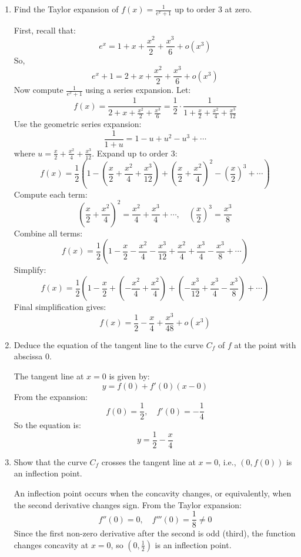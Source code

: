 \documentclass[12pt]{article}
\begin{document}
\begin{answerbox}
  \begin{enumerate}
    \item Find the Taylor expansion of $ f(x) = \frac{1}{e^x + 1} $ up to order 3 at zero.
    
    First, recall that:
    $$
    e^x = 1 + x + \frac{x^2}{2} + \frac{x^3}{6} + o(x^3)
    $$
    So,
    $$
    e^x + 1 = 2 + x + \frac{x^2}{2} + \frac{x^3}{6} + o(x^3)
    $$
    Now compute $ \frac{1}{e^x + 1} $ using a series expansion. Let:
    $$
    f(x) = \frac{1}{2 + x + \frac{x^2}{2} + \frac{x^3}{6}} = \frac{1}{2} \cdot \frac{1}{1 + \frac{x}{2} + \frac{x^2}{4} + \frac{x^3}{12}}
    $$
    Use the geometric series expansion:
    $$
    \frac{1}{1 + u} = 1 - u + u^2 - u^3 + \cdots
    $$
    where $ u = \frac{x}{2} + \frac{x^2}{4} + \frac{x^3}{12} $. Expand up to order 3:
    $$
    f(x) = \frac{1}{2} \left(1 - \left(\frac{x}{2} + \frac{x^2}{4} + \frac{x^3}{12}\right) + \left(\frac{x}{2} + \frac{x^2}{4}\right)^2 - \left(\frac{x}{2}\right)^3 + \cdots \right)
    $$
    Compute each term:
    $$
    \left(\frac{x}{2} + \frac{x^2}{4}\right)^2 = \frac{x^2}{4} + \frac{x^3}{4} + \cdots,\quad \left(\frac{x}{2}\right)^3 = \frac{x^3}{8}
    $$
    Combine all terms:
    $$
    f(x) = \frac{1}{2} \left(1 - \frac{x}{2} - \frac{x^2}{4} - \frac{x^3}{12} + \frac{x^2}{4} + \frac{x^3}{4} - \frac{x^3}{8} + \cdots \right)
    $$
    Simplify:
    $$
    f(x) = \frac{1}{2} \left(1 - \frac{x}{2} + \left(-\frac{x^2}{4} + \frac{x^2}{4}\right) + \left(-\frac{x^3}{12} + \frac{x^3}{4} - \frac{x^3}{8}\right) + \cdots \right)
    $$
    Final simplification gives:
    $$
    f(x) = \frac{1}{2} - \frac{x}{4} + \frac{x^3}{48} + o(x^3)
    $$

    \item Deduce the equation of the tangent line to the curve $ C_f $ of $ f $ at the point with abscissa 0.

    The tangent line at $ x = 0 $ is given by:
    $$
    y = f(0) + f'(0)(x - 0)
    $$
    From the expansion:
    $$
    f(0) = \frac{1}{2},\quad f'(0) = -\frac{1}{4}
    $$
    So the equation is:
    $$
    y = \frac{1}{2} - \frac{x}{4}
    $$

    \item Show that the curve $ C_f $ crosses the tangent line at $ x = 0 $, i.e., $ (0, f(0)) $ is an inflection point.

    An inflection point occurs when the concavity changes, or equivalently, when the second derivative changes sign. From the Taylor expansion:
    $$
    f''(0) = 0,\quad f'''(0) = \frac{1}{8} \neq 0
    $$
    Since the first non-zero derivative after the second is odd (third), the function changes concavity at $ x = 0 $, so $ (0, \frac{1}{2}) $ is an inflection point.


\end{enumerate}
\end{answerbox}
\end{document}
